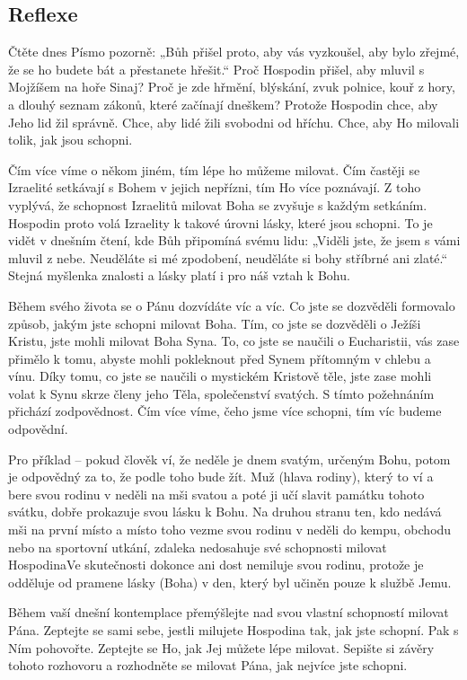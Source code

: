 \documentclass[11pt]{article}
\begin{document}
\subsection*{Reflexe}
Čtěte dnes Písmo pozorně: „Bůh přišel proto, aby vás vyzkoušel, aby bylo zřejmé, že se ho budete bát a přestanete hřešit.“ Proč
Hospodin přišel, aby mluvil s Mojžíšem na hoře Sinaj? Proč je zde hřmění, blýskání, zvuk polnice, kouř z hory, a dlouhý seznam
zákonů, které začínají dneškem? Protože Hospodin chce, aby Jeho lid žil správně. Chce, aby lidé žili svobodni od hříchu. Chce, aby
Ho milovali tolik, jak jsou schopni.

Čím více víme o někom jiném, tím lépe ho můžeme milovat. Čím častěji se Izraelité setkávají s Bohem v jejich nepřízni, tím Ho více
poznávají. Z toho vyplývá, že schopnost Izraelitů milovat Boha se zvyšuje s každým setkáním. Hospodin proto volá Izraelity k takové
úrovni lásky, které jsou schopni. To je vidět v dnešním čtení, kde Bůh připomíná svému lidu: „Viděli jste, že jsem s vámi mluvil z
nebe. Neuděláte si mé zpodobení, neuděláte si bohy stříbrné ani zlaté.“ Stejná myšlenka znalosti a lásky platí i pro náš vztah k Bohu.

Během svého života se o Pánu dozvídáte víc a víc. Co jste se dozvěděli formovalo způsob, jakým jste schopni milovat Boha. Tím,
co jste se dozvěděli o Ježíši Kristu, jste mohli milovat Boha Syna. To, co jste se naučili o Eucharistii, vás zase přimělo k tomu, abyste
mohli pokleknout před Synem přítomným v chlebu a vínu. Díky tomu, co jste se naučili o mystickém Kristově těle, jste zase mohli
volat k Synu skrze členy jeho Těla, společenství svatých. S tímto požehnáním přichází zodpovědnost. Čím více víme, čeho jsme více
schopni, tím víc budeme odpovědní.

Pro příklad – pokud člověk ví, že neděle je dnem svatým, určeným Bohu, potom je odpovědný za to, že podle toho bude žít. Muž
(hlava rodiny), který to ví a bere svou rodinu v neděli na mši svatou a poté ji učí slavit památku tohoto svátku, dobře prokazuje svou
lásku k Bohu. Na druhou stranu ten, kdo nedává mši na první místo a místo toho vezme svou rodinu v neděli do kempu, obchodu
nebo na sportovní utkání, zdaleka nedosahuje své schopnosti milovat HospodinaVe skutečnosti dokonce ani dost nemiluje svou
rodinu, protože je odděluje od pramene lásky (Boha) v den, který byl učiněn pouze k službě Jemu.

Během vaší dnešní kontemplace přemýšlejte nad svou vlastní schopností milovat Pána. Zeptejte se sami sebe, jestli milujete
Hospodina tak, jak jste schopní. Pak s Ním pohovořte. Zeptejte se Ho, jak Jej můžete lépe milovat. Sepište si závěry tohoto rozhovoru
a rozhodněte se milovat Pána, jak nejvíce jste schopni.
\end{document}
